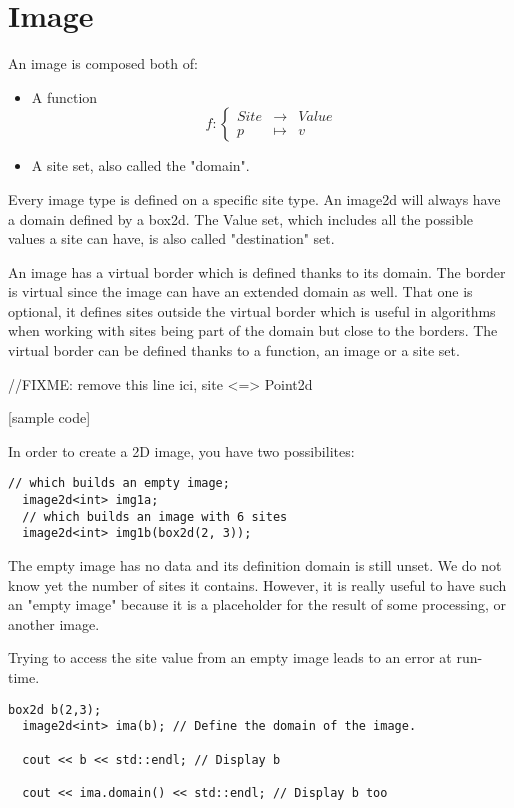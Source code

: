 \documentclass{report}
\begin{document}
\clearpage
\newpage
\section{Image}

An image is composed both of:
\begin{itemize}
\item A function $$
f : \left\{
  \begin{array}{lll}
    Site &\rightarrow & Value \\
    p & \mapsto & v
  \end{array}
\right.
$$
\item A site set, also called the "domain".
\end{itemize}

Every image type is defined on a specific site type. An image2d will always
have a domain defined by a box2d.
The Value set, which includes all the possible values a site can have, is also
called "destination" set.

An image has a virtual border which is defined thanks to its domain. The
 border is virtual since the image can have an extended domain as well.
That one is optional, it defines sites outside the virtual border which is
useful in algorithms when working with sites being part of the domain but close
to the borders. The virtual border can be defined thanks to a function, an
image or a site set.

//FIXME: remove this line
ici, site <=> Point2d


[sample code]

In order to create a 2D image, you have two possibilites:
\begin{lstlisting}[frame=single]
  // which builds an empty image;
  image2d<int> img1a;
  // which builds an image with 6 sites
  image2d<int> img1b(box2d(2, 3));
\end{lstlisting}

The empty image has no data and its definition domain is still unset.  We do
not know yet the number of sites it contains. However, it is really useful to
have such an "empty image" because it is a placeholder for the result of some
processing, or another image.

Trying to access the site value from an empty image leads to an error at
run-time.


\begin{lstlisting}[frame=single]
  box2d b(2,3);
  image2d<int> ima(b); // Define the domain of the image.

  cout << b << std::endl; // Display b

  cout << ima.domain() << std::endl; // Display b too
\end{lstlisting}
\end{document}
